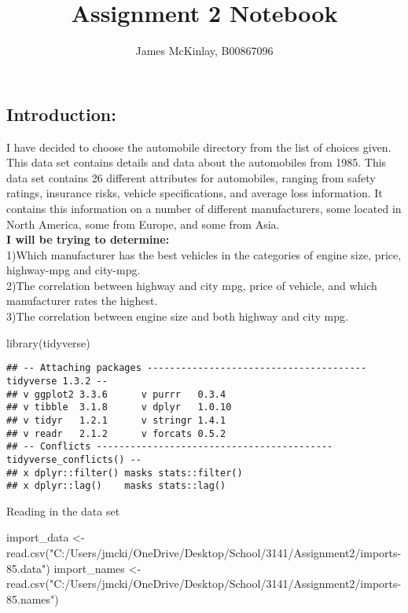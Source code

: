 \documentclass[
]{article}
\title{Assignment 2 Notebook}
\author{James McKinlay, B00867096}
\date{}
\newenvironment{Shaded}{\begin{snugshade}}{\end{snugshade}}
\newcommand{\FunctionTok}[1]{\textcolor[rgb]{0.00,0.00,0.00}{#1}}
\newcommand{\NormalTok}[1]{#1}
\newcommand{\OtherTok}[1]{\textcolor[rgb]{0.56,0.35,0.01}{#1}}
\newcommand{\StringTok}[1]{\textcolor[rgb]{0.31,0.60,0.02}{#1}}
\begin{document}
\maketitle

\hypertarget{introduction}{%
\subsection{Introduction:}\label{introduction}}

I have decided to choose the automobile directory from the list of
choices given. This data set contains details and data about the
automobiles from 1985. This data set contains 26 different attributes
for automobiles, ranging from safety ratings, insurance risks, vehicle
specifications, and average loss information. It contains this
information on a number of different manufacturers, some located in
North America, some from Europe, and some from Asia.\\
\textbf{I will be trying to determine:}\\
1)Which manufacturer has the best vehicles in the categories of engine
size, price, highway-mpg and city-mpg.\\
2)The correlation between highway and city mpg, price of vehicle, and
which manufacturer rates the highest.\\
3)The correlation between engine size and both highway and city mpg.

\begin{Shaded}
\begin{Highlighting}[]
\FunctionTok{library}\NormalTok{(tidyverse)}
\end{Highlighting}
\end{Shaded}

\begin{verbatim}
## -- Attaching packages --------------------------------------- tidyverse 1.3.2 --
## v ggplot2 3.3.6      v purrr   0.3.4 
## v tibble  3.1.8      v dplyr   1.0.10
## v tidyr   1.2.1      v stringr 1.4.1 
## v readr   2.1.2      v forcats 0.5.2 
## -- Conflicts ------------------------------------------ tidyverse_conflicts() --
## x dplyr::filter() masks stats::filter()
## x dplyr::lag()    masks stats::lag()
\end{verbatim}

Reading in the data set

\begin{Shaded}
\begin{Highlighting}[]
\NormalTok{import\_data }\OtherTok{\textless{}{-}} \FunctionTok{read.csv}\NormalTok{(}\StringTok{"C:/Users/jmcki/OneDrive/Desktop/School/3141/Assignment2/imports{-}85.data"}\NormalTok{)}
\NormalTok{import\_names }\OtherTok{\textless{}{-}} \FunctionTok{read.csv}\NormalTok{(}\StringTok{"C:/Users/jmcki/OneDrive/Desktop/School/3141/Assignment2/imports{-}85.names"}\NormalTok{)}
\end{Highlighting}
\end{Shaded}
\end{document}
